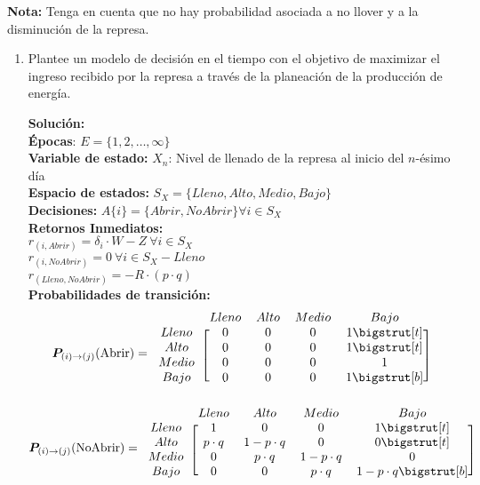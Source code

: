 \textbf{Nota:} Tenga en cuenta que no hay probabilidad asociada a no llover y a la disminución de la represa.
\begin{enumerate}
    \item Plantee un modelo de decisión en el tiempo con el objetivo de maximizar el ingreso recibido por la represa a través de la planeación de la producción de energía.

    \noindent \textbf{Solución:} \\

\noindent \textbf{Épocas}: $E=\{1,2,\dots, \infty\}$ \\
\textbf{Variable de estado:}
    $X_n$: Nivel de llenado de la represa al inicio del $n$-ésimo día\\
\textbf{Espacio de estados:}
    $S_X=\{Lleno, Alto, Medio, Bajo\}$ \\
\textbf{Decisiones:}
$A\{i\}=\{Abrir, No Abrir\} \forall i \in S_X$\\
\textbf{Retornos Inmediatos:}\\
$r_{(i,Abrir)} = \delta_i \cdot W - Z \ \forall i \in S_X$\\
$r_{(i,NoAbrir)} = 0  \ \forall i \in S_X -{Lleno}$ \\
$r_{(Lleno,NoAbrir)} =  - R\cdot (p\cdot q)$ \\
\noindent \textbf{Probabilidades de transición:} 
\begin{equation*}
    \bm{P}_{(i) \to (j)}(\text{Abrir}) =
    \begin{blockarray}{cccccc}
        & Lleno & Alto & Medio & Bajo \\
    \begin{block}{c[ccccc]}
    Lleno & 0& 0& 0&1\bigstrut[t] \\
    Alto & 0&0&0&1\bigstrut[t] \\
    Medio & 0& 0& 0& 1\\
    Bajo & 0&0& 0&1\bigstrut[b]\\
    \end{block}
    \end{blockarray}\vspace*{-1.25\baselineskip}
\end{equation*}
\begin{equation*}
    \bm{P}_{(i) \to (j)}(\text{NoAbrir}) =
    \begin{blockarray}{cccccc}
        & Lleno & Alto & Medio & Bajo \\
    \begin{block}{c[ccccc]}
    Lleno & 1& 0& 0&1\bigstrut[t] \\
    Alto & p\cdot q & 1 - p \cdot q &0&0\bigstrut[t] \\
    Medio & 0& p \cdot q & 1 - p \cdot q & 0\\
    Bajo & 0&0& p \cdot q &1 - p \cdot q\bigstrut[b]\\
    \end{block}
    \end{blockarray}\vspace*{-1.25\baselineskip}
\end{equation*}

\end{enumerate}

